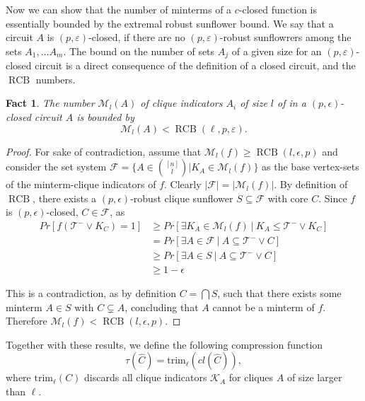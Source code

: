 \documentclass[10pt,a4paper]{article}
\newcommand{\trim}{\mathrm{trim}}
\newcommand{\RCB}{\mathop{RCB}}
\newtheorem{fact}[theorem]{Fact}
\newcommand{\icomp}{\tau}
\newcommand{\jnote}[1]{\todo[inline,backgroundcolor=blue!20!green]{#1 \\ \textsc{--Jarek}}}
\begin{document}
Now we can show that the number of minterms of a $c$-closed function is essentially bounded by the extremal robust sunflower bound.
\fi
We say that a circuit $A$ is $(p, \varepsilon)$-closed, if there are no $(p, \varepsilon)$-robust sunflowrers among the sets $A_1, \ldots A_m$.
The bound on the number of sets $A_j$ of a given size for an $(p, \varepsilon)$-closed circuit is a direct consequence of the definition of a closed circuit, and the $\RCB$ numbers. 
\begin{fact}
\label{lem:minterms-bound}
    The number $\mathcal{M}_l(A)$ of clique indicators $A_i$  of size $l$ of in a $(p, \epsilon)$-closed circuit $A$ is bounded by $$\mathcal{M}_l(A) < \RCB(\ell, p, \varepsilon).$$
\end{fact}
\iffalse
\begin{proof}
    For sake of contradiction, assume that $\mathcal{M}_l(f) \geq \RCB(l, \epsilon, p)$ and consider the set system $\mathcal{F} = \{A \in \binom{[n]}{l} | K_A \in \mathcal{M}_l(f)\}$ as the base vertex-sets of the minterm-clique indicators of $f$. Clearly $|\mathcal{F}| = |\mathcal{M}_l(f)|$. By definition of~$\RCB$, there exists a $(p, \epsilon)$-robust clique sunflower $S\subseteq \mathcal{F}$ with core $C$. Since $f$ is $(p, \epsilon)$-closed,  $C \in \mathcal{F}$, as
    \begin{align}
        Pr[f(\mathcal{T}^- \vee K_C) = 1] & \geq  Pr[\exists K_A \in \mathcal{M}_l(f) \ | \ K_A \leq \mathcal{T}^- \vee K_C] \\
        & =  Pr[\exists A \in \mathcal{F} \ | \ A \subseteq \mathcal{T}^- \vee C] \\
        & \geq Pr[\exists A \in S \ | \ A \subseteq \mathcal{T}^- \vee C] \\
        & \geq 1-\epsilon
    \end{align}

    This is a contradiction, as by definition $C = \bigcap S$, such that there exists some minterm $A \in S$ with $C \subsetneq A$, concluding that $A$ cannot be a minterm of $f$. Therefore $\mathcal{M}_l(f) < \RCB(l, \epsilon, p)$.
\end{proof}

Together with these results, we define the following compression function 
$$\icomp(\hat{C}) = \trim_\ell(cl(\hat{C})),$$
where $\trim_\ell(C)$ discards all clique indicators $\mathcal{K}_A$ for cliques $A$ of size larger than $\ell$.
\end{document}
